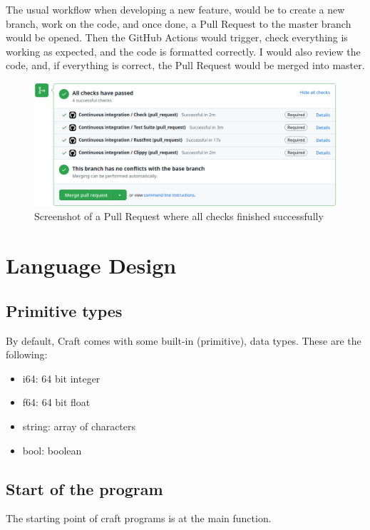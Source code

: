 ﻿\documentclass[10pt,a4paper,twocolumn,twoside]{article}
\begin{document}
The usual workflow when developing a new feature, would be to create a new
branch, work on the code, and once done, a Pull Request to the master branch
would be opened. Then the GitHub Actions would trigger, check everything is 
working as expected, and the code is formatted correctly. I would also review 
the code, and, if everything is correct, the Pull Request would be merged into
master.

\begin{figure}[ht]
\centering
\captionsetup{justification=centering,margin=1cm}
\includegraphics[width=\linewidth]{ci-pr-success}
\caption{Screenshot of a Pull Request where all checks finished successfully}
\end{figure}

\section{Language Design}

\subsection{Primitive types}
By default, Craft comes with some built-in (primitive), data types. These are
the following:

\begin{itemize}
    \item i64: 64 bit integer
    \item f64: 64 bit float
    \item string: array of characters
    \item bool: boolean
\end{itemize}

\subsection{Start of the program}
The starting point of craft programs is at the main function.
\end{document}
